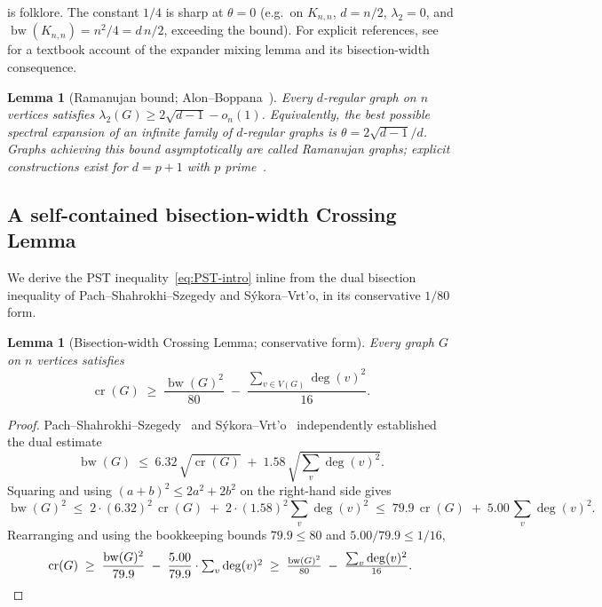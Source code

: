 \documentclass[11pt,a4paper]{article}
\newtheorem{lemma}[theorem]{Lemma}
\theoremstyle{definition}
\DeclareMathOperator{\crN}{cr}
\DeclareMathOperator{\bw}{bw}
\begin{document}
 is folklore. The constant $1/4$ is sharp at
$\theta = 0$ (e.g.\ on $K_{n,n}$, $d = n/2$, $\lambda_2 = 0$, and
$\bw(K_{n,n}) = n^{2}/4 = d\,n/2$, exceeding the bound). For
explicit references, see~\cite[Theorem 2.4]{HLW} for a textbook
account of the expander mixing lemma and its bisection-width
consequence.

\begin{lemma}[Ramanujan bound; Alon--Boppana~\cite{Alon86, Nilli}]\label{lem:ramanujan}
Every $d$-regular graph on $n$ vertices satisfies
$\lambda_2(G) \ge 2\sqrt{d - 1} - o_n(1)$. Equivalently, the best
possible spectral expansion of an infinite family of $d$-regular
graphs is $\theta = 2\sqrt{d - 1}/d$. Graphs achieving this bound
asymptotically are called \emph{Ramanujan graphs}; explicit
constructions exist for $d = p + 1$ with $p$ prime~\cite{LPS}.
\end{lemma}

\subsection{A self-contained bisection-width Crossing Lemma}
\label{sec:PST}

We derive the PST inequality~\eqref{eq:PST-intro} inline from the
dual bisection inequality of Pach--Shahrokhi--Szegedy and
S\'ykora--Vrt'o, in its conservative $1/80$ form.

\begin{lemma}[Bisection-width Crossing Lemma; conservative form]\label{lem:PST}
Every graph $G$ on $n$ vertices satisfies
\begin{equation}\label{eq:PST-explicit}
   \crN(G) \;\ge\; \frac{\bw(G)^{2}}{80} \;-\; \frac{\sum_{v \in V(G)} \deg(v)^{2}}{16}.
\end{equation}
\end{lemma}

\begin{proof}
Pach--Shahrokhi--Szegedy~\cite{PachShahrokhiSzegedy} and S\'ykora--Vrt'o~\cite{SykoraVrto}
independently established the dual estimate
\begin{equation}\label{eq:PSS}
   \bw(G) \;\le\; 6.32\,\sqrt{\crN(G)} \;+\; 1.58\,\sqrt{\textstyle\sum_v \deg(v)^{2}}.
\end{equation}
Squaring and using $(a + b)^{2} \le 2 a^{2} + 2 b^{2}$ on the
right-hand side gives
\[
   \bw(G)^{2} \;\le\; 2 \cdot (6.32)^{2}\,\crN(G) \;+\; 2 \cdot (1.58)^{2} \textstyle\sum_v \deg(v)^{2}
          \;\le\; 79.9\,\crN(G) \;+\; 5.00\,\textstyle\sum_v \deg(v)^{2}.
\]
Rearranging and using the bookkeeping bounds $79.9 \le 80$ and
$5.00/79.9 \le 1/16$,
\[
   \crN(G) \;\ge\; \frac{\bw(G)^{2}}{79.9} \;-\; \frac{5.00}{79.9} \cdot
                   \textstyle\sum_v \deg(v)^{2}
   \;\ge\; \frac{\bw(G)^{2}}{80} \;-\; \frac{\textstyle\sum_v \deg(v)^{2}}{16}.
\qedhere
\]
\end{proof}
\end{document}
